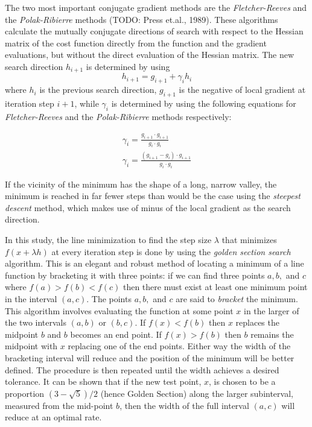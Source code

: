 The two most important conjugate gradient methods are the
\emph{Fletcher-Reeves} and the \emph{Polak-Ribierre} methods (TODO: Press
et.al., 1989). These algorithms calculate the mutually conjugate directions
of search with respect to the Hessian matrix of the cost function directly
from the function and the gradient evaluations, but without the direct
evaluation of the Hessian matrix. The new search direction $h_{i+1}$ is
determined by using
\begin{equation}
   h_{i+1} = g_{i+1}+\gamma_i h_i
\end{equation}
where $h_i$ is the previous search direction, $g_{i+1}$ is the negative of
local gradient at iteration step $i+1$, while $\gamma_i$ is determined by
using the following equations for \emph{Fletcher-Reeves} and the
\emph{Polak-Ribierre} methods respectively:

\begin{eqnarray}
   \gamma_i=\frac{g_{i+1} \cdot g_{i+1}}{g_{i} \cdot g_{i}} \\
   \gamma_i=\frac{(g_{i+1}-g_{i}) \cdot g_{i+1}}{g_{i} \cdot g_{i}}
\end{eqnarray}

If the vicinity of the minimum has the shape of a long, narrow valley, the
minimum is reached in far fewer steps than would be the case using the
\emph{steepest descent} method, which makes use of minus of the local
gradient as the search direction.

In this study, the line minimization to find the step size $\lambda$ that
minimizes $f(x+\lambda h)$ at every iteration step is done by using the
\emph{golden section search} algorithm. This is an elegant and robust
method of locating a minimum of a line function by bracketing it with three
points: if we can find three points $a,b,$ and $c$ where $f(a)>f(b)<f(c)$
then there must exist at least one minimum point in the interval $(a,c)$.
The points $a,b,$ and $c$ are said to \emph{bracket} the minimum. This
algorithm involves evaluating the function at some point $x$ in the larger
of the two intervals $(a,b)$ or $(b,c)$. If $f(x)<f(b)$ then $x$ replaces
the midpoint $b$ and $b$ becomes an end point. If $f(x)>f(b)$ then $b$
remains the midpoint with $x$ replacing one of the end points. Either way
the width of the bracketing interval will reduce and the position of the
minimum will be better defined. The procedure is then repeated until the
width achieves a desired tolerance. It can be shown that if the new test
point, $x$, is chosen to be a proportion $(3-\sqrt{5})/2$ (hence Golden
Section) along the larger subinterval, measured from the mid-point $b$,
then the width of the full interval $(a,c)$ will reduce at an optimal rate.

